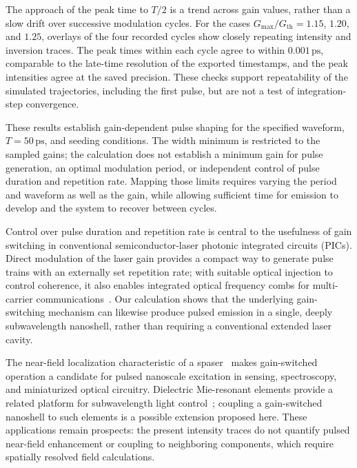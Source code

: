 \documentclass{optica-article}
\begin{document}
The approach of the peak time to $T/2$ is a trend across gain values, rather than a slow drift over successive modulation cycles. For the cases $G_{\max}/G_{\mathrm{th}}=1.15$, $1.20$, and $1.25$, overlays of the four recorded cycles show closely repeating intensity and inversion traces. The peak times within each cycle agree to within $0.001\,\mathrm{ps}$, comparable to the late-time resolution of the exported timestamps, and the peak intensities agree at the saved precision. These checks support repeatability of the simulated trajectories, including the first pulse, but are not a test of integration-step convergence.

These results establish gain-dependent pulse shaping for the specified waveform, $T=50\,\mathrm{ps}$, and seeding conditions. The width minimum is restricted to the sampled gains; the calculation does not establish a minimum gain for pulse generation, an optimal modulation period, or independent control of pulse duration and repetition rate. Mapping those limits requires varying the period and waveform as well as the gain, while allowing sufficient time for emission to develop and the system to recover between cycles.

Control over pulse duration and repetition rate is central to the usefulness of gain switching in conventional semiconductor-laser photonic integrated circuits (PICs). Direct modulation of the laser gain provides a compact way to generate pulse trains with an externally set repetition rate; with suitable optical injection to control coherence, it also enables integrated optical frequency combs for multi-carrier communications~\cite{Hammad:2021}. Our calculation shows that the underlying gain-switching mechanism can likewise produce pulsed emission in a single, deeply subwavelength nanoshell, rather than requiring a conventional extended laser cavity.

The near-field localization characteristic of a spaser~\cite{stockman:2008} makes gain-switched operation a candidate for pulsed nanoscale excitation in sensing, spectroscopy, and miniaturized optical circuitry. Dielectric Mie-resonant elements provide a related platform for subwavelength light control~\cite{Rybin2024Metaphotonics}; coupling a gain-switched nanoshell to such elements is a possible extension proposed here. These applications remain prospects: the present intensity traces do not quantify pulsed near-field enhancement or coupling to neighboring components, which require spatially resolved field calculations.
\end{document}
